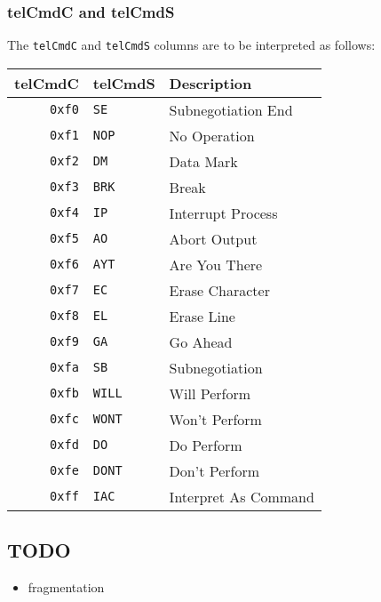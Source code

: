 \documentclass[documentation]{subfiles}
\begin{document}
\subsubsection{telCmdC and telCmdS}\label{telCmd}
The {\tt telCmdC} and {\tt telCmdS} columns are to be interpreted as follows:\\
\begin{longtable}{rll}
    \toprule
    {\bf telCmdC} & {\bf telCmdS} & {\bf Description} \\
    \midrule\endhead%
    {\tt 0xf0} & {\tt SE}   & Subnegotiation End\\
    {\tt 0xf1} & {\tt NOP}  & No Operation\\
    {\tt 0xf2} & {\tt DM}   & Data Mark\\
    {\tt 0xf3} & {\tt BRK}  & Break\\
    {\tt 0xf4} & {\tt IP}   & Interrupt Process\\
    {\tt 0xf5} & {\tt AO}   & Abort Output\\
    {\tt 0xf6} & {\tt AYT}  & Are You There\\
    {\tt 0xf7} & {\tt EC}   & Erase Character\\
    {\tt 0xf8} & {\tt EL}   & Erase Line\\
    {\tt 0xf9} & {\tt GA}   & Go Ahead\\
    {\tt 0xfa} & {\tt SB}   & Subnegotiation\\
    {\tt 0xfb} & {\tt WILL} & Will Perform\\
    {\tt 0xfc} & {\tt WONT} & Won't Perform\\
    {\tt 0xfd} & {\tt DO}   & Do Perform\\
    {\tt 0xfe} & {\tt DONT} & Don't Perform\\
    {\tt 0xff} & {\tt IAC}  & Interpret As Command\\
    \bottomrule
\end{longtable}

\subsection{TODO}
\begin{itemize}
    \item fragmentation
\end{itemize}
\end{document}
